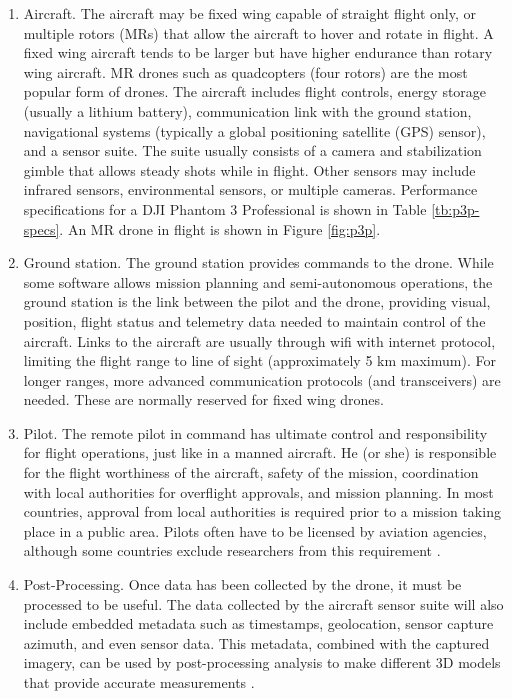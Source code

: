 \documentclass[preprint,12pt,a4paper,authoryear]{elsarticle}
\begin{document}
\begin{linenumbers}
\begin{enumerate}
\item Aircraft. The aircraft may be fixed wing capable of straight flight only, or multiple rotors (MRs) that allow the aircraft to hover and rotate in flight. A fixed wing aircraft tends to be larger but have higher endurance than rotary wing aircraft. MR drones such as quadcopters (four rotors) are the most popular form of drones. The aircraft includes flight controls, energy storage (usually a lithium battery), communication link with the ground station, navigational systems (typically a global positioning satellite (GPS) sensor), and a sensor suite. The suite usually consists of a camera and stabilization gimble that allows steady shots while in flight. Other sensors may include infrared sensors, environmental sensors, or multiple cameras. Performance specifications for a DJI Phantom 3 Professional is shown in Table \ref{tb:p3p-specs}. An MR drone in flight is shown in Figure \ref{fig:p3p}.

\item Ground station. The ground station provides commands to the drone. While some software allows mission planning and semi-autonomous operations, the ground station is the link between the pilot and the drone, providing visual, position, flight status and telemetry data needed to maintain control of the aircraft. Links to the aircraft are usually through wifi with internet protocol, limiting the flight range to line of sight (approximately 5 km maximum). For longer ranges, more advanced communication protocols (and transceivers) are needed. These are normally reserved for fixed wing drones.

\item Pilot. The remote pilot in command has ultimate control and responsibility for flight operations, just like in a manned aircraft. He (or she) is responsible for the flight worthiness of the aircraft, safety of the mission, coordination with local authorities for overflight approvals, and mission planning. In most countries, approval from local authorities is required prior to a mission taking place in a public area. Pilots often have to be licensed by aviation agencies, although some countries exclude researchers from this requirement \citep{UAVCoach2017}.

\item Post-Processing. Once data has been collected by the drone, it must be processed to be useful. The data collected by the aircraft sensor suite will also include embedded metadata such as timestamps, geolocation, sensor capture azimuth, and even sensor data. This metadata, combined with the captured imagery, can be used by post-processing analysis to make different 3D models that provide accurate measurements \citep{Sona2014}. 


\end{enumerate}
\end{linenumbers}
\end{document}
